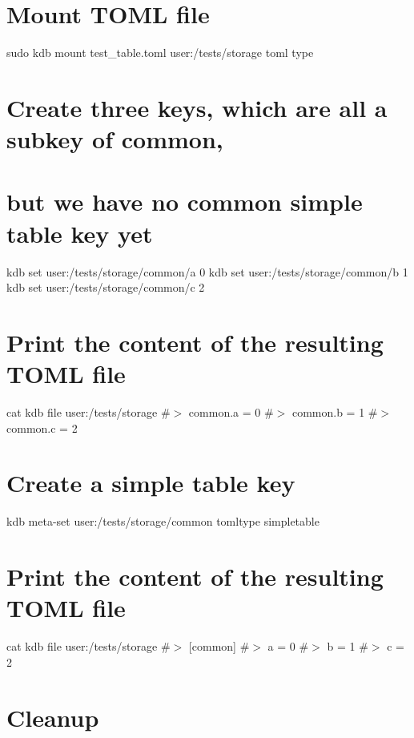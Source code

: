  \hypertarget{autotoc_md635_autotoc_md699}{}\section{Mount T\+O\+M\+L file}\label{autotoc_md635_autotoc_md699}
sudo kdb mount test\+\_\+table.\+toml user\+:/tests/storage toml type\hypertarget{autotoc_md635_autotoc_md700}{}\section{Create three keys, which are all a subkey of \textquotesingle{}common\textquotesingle{},}\label{autotoc_md635_autotoc_md700}
\hypertarget{autotoc_md635_autotoc_md701}{}\section{but we have no \textquotesingle{}common\textquotesingle{} simple table key yet}\label{autotoc_md635_autotoc_md701}
kdb set \textquotesingle{}user\+:/tests/storage/common/a\textquotesingle{} \textquotesingle{}0\textquotesingle{} kdb set \textquotesingle{}user\+:/tests/storage/common/b\textquotesingle{} \textquotesingle{}1\textquotesingle{} kdb set \textquotesingle{}user\+:/tests/storage/common/c\textquotesingle{} \textquotesingle{}2\textquotesingle{}\hypertarget{autotoc_md635_autotoc_md702}{}\section{Print the content of the resulting T\+O\+M\+L file}\label{autotoc_md635_autotoc_md702}
cat {\ttfamily kdb file user\+:/tests/storage} \#$>$ common.\+a = 0 \#$>$ common.\+b = 1 \#$>$ common.\+c = 2\hypertarget{autotoc_md635_autotoc_md703}{}\section{Create a simple table key}\label{autotoc_md635_autotoc_md703}
kdb meta-\/set \textquotesingle{}user\+:/tests/storage/common\textquotesingle{} \textquotesingle{}tomltype\textquotesingle{} \textquotesingle{}simpletable\textquotesingle{}\hypertarget{autotoc_md635_autotoc_md704}{}\section{Print the content of the resulting T\+O\+M\+L file}\label{autotoc_md635_autotoc_md704}
cat {\ttfamily kdb file user\+:/tests/storage} \#$>$ \mbox{[}common\mbox{]} \#$>$ a = 0 \#$>$ b = 1 \#$>$ c = 2\hypertarget{autotoc_md635_autotoc_md705}{}\section{Cleanup}\label{autotoc_md635_autotoc_md705}
